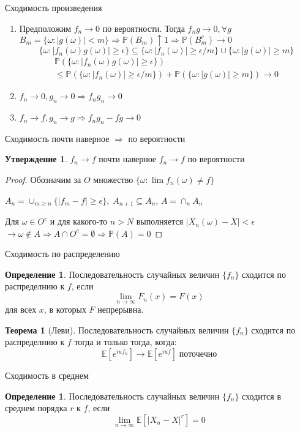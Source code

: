 \documentclass{beamer}%
\theoremstyle{definition}
\newtheorem{mytheor}[theorem]{Теорема}
\newtheorem{mydef}[theorem]{Определение}
\newtheorem{proposition}[theorem]{Утверждение}
\newcommand{\E}{\mathbb{E}}
\renewcommand{\P}{\mathbb{P}}
\begin{document}
\begin{frame}{Сходимость произведения}
\begin{enumerate}
    \item Предположим $f_n \to 0$ по вероятности. Тогда $f_ng \to 0, \forall g$
    $B_m = \{\omega: |g(\omega)| < m\} \Rightarrow \P(B_m) \uparrow 1 
    \Rightarrow \P(B_m^c) \to 0$
    $$
    \{\omega: |f_n(\omega)g(\omega)| \geq \epsilon\} \subseteq 
     \{\omega: |f_n(\omega)| \geq \epsilon /m\} \cup
     \{\omega: |g(\omega)| \geq m\}
    $$
    \begin{multline*}
    \P(\{\omega: |f_n(\omega)g(\omega)| \geq \epsilon\}) \\ \leq
    \P(\{\omega: |f_n(\omega)| \geq \epsilon /m\}) +
    \P(\{\omega: |g(\omega)| \geq m\}) \to 0
    \end{multline*}
    \item $f_n \to 0, g_n \to 0 \Rightarrow f_ng_n \to 0$
    \item $f_n \to f, g_n \to g  \Rightarrow f_ng_n - fg \to 0$
\end{enumerate}
\end{frame}



\begin{frame}{Сходимость почти наверное $\Rightarrow$ по вероятности}
\begin{proposition}
$f_n \to f$ почти наверное $f_n \to f$ по вероятности 
\end{proposition}
\begin{proof}
Обозначим за $O$ множество $\{\omega: \lim f_n(\omega) \neq f\}$

$A_n = \cup_{m \geq n}\{|f_m - f| \geq \epsilon\}, \; A_{n+1} \subseteq A_n$, $A = \cap_n A_n$

Для $\omega \in O^c$ и для какого-то $n > N$ выполняется $|X_n(\omega) - X| < \epsilon$ $\rightarrow \omega \notin A \Rightarrow A \cap O^c = \emptyset \Rightarrow \P(A) = 0$
\end{proof}
\end{frame}



\begin{frame}{Сходимость по распределению}
    
\begin{mydef}
Последовательность случайных величин $\{f_n\}$ сходится по распределнию к $f$, если
$$
\lim_{n \to \infty} F_n(x) = F(x)
$$
для всех $x$, в которых $F$ непрерывна.
\end{mydef}

\begin{mytheor}[Леви]
Последовательность случайных величин $\{f_n\}$ сходится по распределнию к $f$ тогда и только тогда, когда:
$$
\E[e^{iuf_n}] \to \E[e^{iuf}]\;  \text{поточечно}
$$
\end{mytheor}

\end{frame}

\begin{frame}{Сходимость в среднем}
\begin{mydef}
Последовательность случайных величин $\{f_n\}$ сходится в среднем порядка $r$ к $f$, если
$$
\lim_{n \to \infty} \E[|X_n - X|^r] = 0
$$
\end{mydef}

\end{frame}
\end{document}
